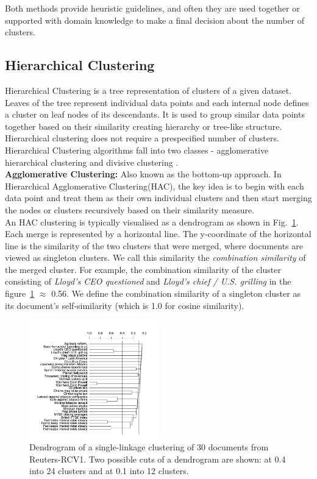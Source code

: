 \documentclass[conference]{IEEEtran}
\begin{document}
Both methods provide heuristic guidelines, and often they are used together or supported with domain knowledge to make a final decision about the number of clusters.

\subsection{Hierarchical Clustering}
Hierarchical Clustering is a tree representation of clusters of a given dataset. Leaves of the tree represent individual data points and each internal node defines a cluster on leaf nodes of its descendants. It is used to group similar data points together based on their similarity creating hierarchy or tree-like structure. Hierarchical clustering does not require a prespecified number of clusters. Hierarchical Clustering algorithms fall into two classes - agglomerative hierarchical clustering and divisive clustering \cite{manning2008information, tan2005clustering}. \\

\textbf{Agglomerative Clustering:} Also known as the bottom-up approach. In Hierarchical Agglomerative Clustering(HAC), the key idea is to begin with each data point and treat them as their own individual clusters and then start merging the nodes or clusters recursively based on their similarity measure.\\

An HAC clustering is typically visualised as a dendrogram as shown in Fig.~\ref{fig:dendrogram}. Each merge is represented by a horizontal line. The y-coordinate of the horizontal line is the similarity of the two clusters that were merged, where documents are viewed as singleton clusters. We call this similarity the \textit{combination similarity} of the merged cluster. For example, the combination similarity of the cluster consisting of \textit{Lloyd's CEO questioned} and \textit{Lloyd's chief / U.S. grilling} in the figure~\ref{fig:dendrogram} $\approx$ 0.56. We define the combination similarity of a singleton cluster as its document's self-similarity (which is 1.0 for cosine similarity). \\

\begin{figure}[h]
  \centering
  \includegraphics[width=0.5\textwidth]{dendrogram.png}
  \caption{Dendrogram of a single-linkage clustering of 30 documents from Reuters-RCV1. Two possible cuts of a dendrogram are shown: at 0.4 into 24 clusters and at 0.1 into 12 clusters.}
  \label{fig:dendrogram}
\end{figure}
\end{document}
